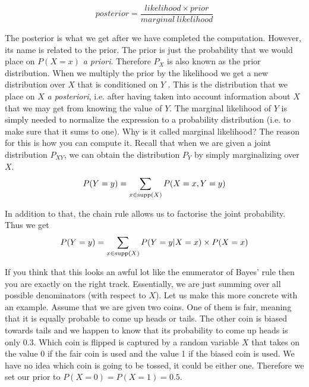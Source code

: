 $$ \mathit{posterior} = \dfrac{\mathit{likelihood} \times \mathit{prior}}{\mathit{marginal~likelihood}} $$

The posterior is what we get after we have completed the computation. However, its name is related to the prior.
The prior is just the probability that we would place on $ P(X=x) $ \textit{a priori}. Therefore $ P_{X} $
is also known as the prior distribution. When we multiply the prior by the likelihood we get a new distribution
over $ X $ that is conditioned on $ Y $ . This is the distribution that we place on $ X $ \textit{a posteriori}, i.e.
after having taken into account information about $ X $ that we may get from knowing the value of $ Y $. The marginal
likelihood of $ Y $ is simply needed to normalize the expression to a probability distribution (i.e. to make sure that
it sums to one). Why is it called marginal likelihood? The reason for this is how you can compute it. Recall that when
we are given a joint distribution $ P_{XY} $, we can obtain the distribution
$ P_{Y} $ by simply marginalizing over $ X $.
\begin{equation}
P(Y=y) = \sum_{x \in \operatorname{supp}(X)}P(X=x, Y=y)
\end{equation}

In addition to that, the chain rule allows us to factorise the joint probability. Thus we get
\begin{equation}
P(Y=y) = \sum_{x \in \operatorname{supp}(X)} P(Y=y|X=x) \times P(X=x)
\end{equation}

If you think that this looks an awful lot like the enumerator of Bayes' rule then you are exactly on the right track.
Essentially, we are just summing over all possible denominators (with respect to $ X $). Let us make this more
concrete with an example. Assume that we are given two coins. One of them is fair, meaning that it is equally probable
to come up heads or tails. The other coin is biased towards tails and we happen to know that its probability to come up
heads is only $ 0.3 $. Which coin is flipped is captured by a random variable $ X $ that takes on the value 0 if the
fair coin is used and the value 1 if the biased coin is used. We have no idea which coin is going to be tossed, it could
be either one. Therefore we set our prior to $ P(X=0) = P(X=1) = 0.5 $.


